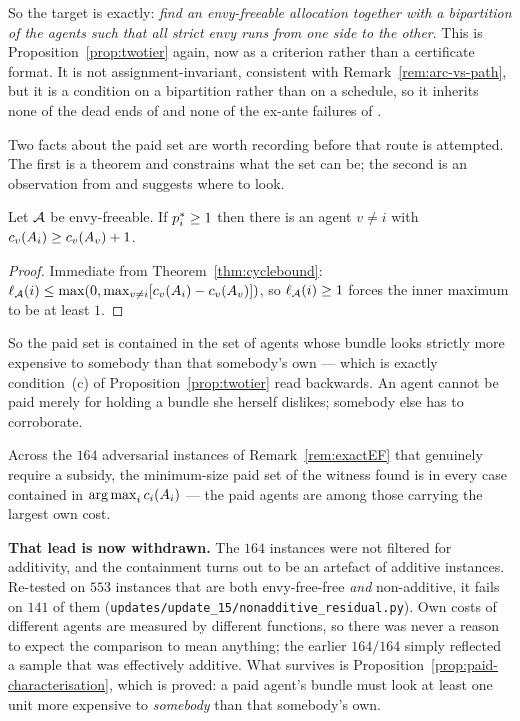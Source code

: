 So the target is exactly: \emph{find an envy-freeable allocation together with a
bipartition of the agents such that all strict envy runs from one side to the
other}. This is Proposition~\ref{prop:twotier} again, now as a criterion rather
than a certificate format. It is not assignment-invariant, consistent with
Remark~\ref{rem:arc-vs-path}, but it is a condition on a bipartition rather than
on a schedule, so it inherits none of the dead ends of  and
none of the ex-ante failures of .

Two facts about the paid set are worth recording before that route is attempted.
The first is a theorem and constrains what the set can be; the second is an
observation from  and suggests where to look.

\begin{proposition}
\label{prop:paid-characterisation}
Let $\mathcal{A}$ be envy-freeable. If $p^{*}_i \ge 1$ then there is an agent
$v \ne i$ with $c_v(A_{i}) \ge c_v(A_{v}) + 1$.
\end{proposition}

\begin{proof}
Immediate from Theorem~\ref{thm:cyclebound}: $\ell_{\mathcal{A}}(i) \le
\max(0, \max_{v \ne i}[c_v(A_{i}) - c_v(A_{v})])$, so
$\ell_{\mathcal{A}}(i) \ge 1$ forces the inner maximum to be at least $1$.
\end{proof}

So the paid set is contained in the set of agents whose bundle looks strictly
more expensive to somebody than that somebody's own --- which is exactly
condition~(c) of Proposition~\ref{prop:twotier} read backwards. An agent cannot
be paid merely for holding a bundle she herself dislikes; somebody else has to
corroborate.

\begin{remark}
\label{rem:paid-empirics}
Across the $164$ adversarial instances of Remark~\ref{rem:exactEF} that
genuinely require a subsidy, the minimum-size paid set of the witness found is
in every case contained in $\operatorname*{arg\,max}_i c_i(A_{i})$ --- the paid agents
are among those carrying the largest own cost.

\textbf{That lead is now withdrawn.} The $164$ instances were not filtered for
additivity, and the containment turns out to be an artefact of additive
instances. Re-tested on $553$ instances that are both envy-free-free
\emph{and} non-additive, it fails on $141$ of them
(\texttt{updates/update\_15/nonadditive\_residual.py}). Own costs of different agents
are measured by different functions, so there was never a reason to expect the
comparison to mean anything; the earlier $164/164$ simply reflected a sample
that was effectively additive. What survives is
Proposition~\ref{prop:paid-characterisation}, which is proved: a paid agent's
bundle must look at least one unit more expensive to \emph{somebody} than that
somebody's own.
\end{remark}
